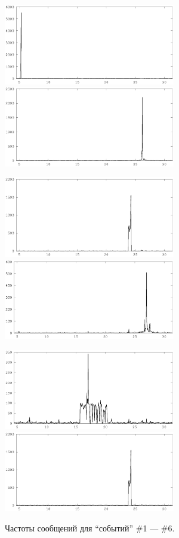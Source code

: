 \documentclass[12pt, a4paper]{article}
\begin{document}
	\begin{figure}[H]
	\centering

	\includegraphics[width=7.5cm]{all-freq-5-8.eps}	
	\includegraphics[width=7.5cm]{all-freq-26-5.eps}	
	
	\includegraphics[width=7.5cm]{all-freq-24-6.eps}	
	\includegraphics[width=7.5cm]{all-freq-27-0-1.eps}	
	
	\includegraphics[width=7.5cm]{all-freq-17-2-1.eps}	
	\includegraphics[width=7.5cm]{all-freq-23-20.eps}	
	
	\caption{Частоты сообщений для ``событий'' \#1 --- \#6.}
	\end{figure}
	
\end{document}
